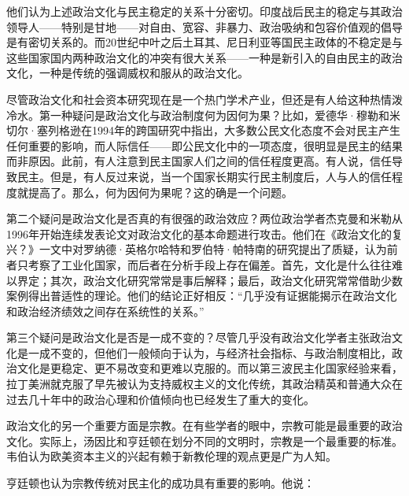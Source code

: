 他们认为上述政治文化与民主稳定的关系十分密切。印度战后民主的稳定与其政治领导人——特别是甘地——对自由、宽容、非暴力、政治吸纳和包容价值观的倡导是有密切关系的。而20世纪中叶之后土耳其、尼日利亚等国民主政体的不稳定是与这些国家国内两种政治文化的冲突有很大关系——一种是新引入的自由民主的政治文化，一种是传统的强调威权和服从的政治文化。

尽管政治文化和社会资本研究现在是一个热门学术产业，但还是有人给这种热情泼冷水。第一种疑问是政治文化与政治制度何为因何为果？比如，爱德华·穆勒和米切尔·塞列格逊在1994年的跨国研究中指出，大多数公民文化态度不会对民主产生任何重要的影响，而人际信任——即公民文化中的一项态度，很明显是民主的结果而非原因。此前，有人注意到民主国家人们之间的信任程度更高。有人说，信任导致民主。但是，有人反过来说，当一个国家长期实行民主制度后，人与人的信任程度就提高了。那么，何为因何为果呢？这的确是一个问题。

第二个疑问是政治文化是否真的有很强的政治效应？两位政治学者杰克曼和米勒从1996年开始连续发表论文对政治文化的基本命题进行攻击。他们在《政治文化的复兴？》一文中对罗纳德·英格尔哈特和罗伯特·帕特南的研究提出了质疑，认为前者只考察了工业化国家，而后者在分析手段上存在偏差。首先，文化是什么往往难以界定；其次，政治文化研究常常是事后解释；最后，政治文化研究常常借助少数案例得出普适性的理论。他们的结论正好相反：“几乎没有证据能揭示在政治文化和政治经济绩效之间存在系统性的关系。”

第三个疑问是政治文化是否是一成不变的？尽管几乎没有政治文化学者主张政治文化是一成不变的，但他们一般倾向于认为，与经济社会指标、与政治制度相比，政治文化是更稳定、更不易改变和更难以克服的。而以第三波民主化国家经验来看，拉丁美洲就克服了早先被认为支持威权主义的文化传统，其政治精英和普通大众在过去几十年中的政治心理和价值倾向也已经发生了重大的变化。

政治文化的另一个重要方面是宗教。在有些学者的眼中，宗教可能是最重要的政治文化。实际上，汤因比和亨廷顿在划分不同的文明时，宗教是一个最重要的标准。韦伯认为欧美资本主义的兴起有赖于新教伦理的观点更是广为人知。

亨廷顿也认为宗教传统对民主化的成功具有重要的影响。他说：


